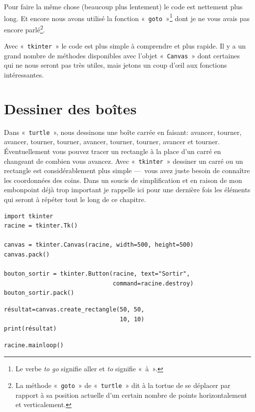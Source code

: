 Pour faire la même chose (beaucoup plus lentement) le code est nettement plus long. Et encore nous avons utilisé la fonction « \texttt{goto} »\footnote{Le verbe \emph{to go} signifie aller et \emph{to} signifie « à ».} dont je ne vous avais pas encore parlé\footnote{La méthode « \texttt{goto} » de « \texttt{turtle} » dit à la tortue de se déplacer par rapport à sa position actuelle d'un certain nombre de points horizontalement et verticalement.}. 

Avec « \texttt{tkinter} » le code est plus simple à comprendre et plus rapide. Il y a un grand nombre de méthodes disponibles avec l'objet « \texttt{Canvas} » dont certaines qui ne nous seront pas très utiles, mais jetons un coup d'œil aux fonctions intéressantes.

\section{Dessiner des boîtes}

Dans « \texttt{turtle} », nous dessinons une boîte carrée en faisant: avancer, tourner, avancer, tourner, tourner, avancer, tourner, tourner, avancer et tourner. Éventuellement vous pouvez tracer un rectangle à la place d'un carré en changeant de combien vous avancez. Avec « \texttt{tkinter} » dessiner un carré ou un rectangle est considérablement plus simple --- vous avez juste besoin de connaître les coordonnées des coins.
Dans un soucis de simplification et en raison de mon embonpoint déjà trop important je rappelle ici pour une dernière fois les éléments qui seront à répéter tout le long de ce chapitre.

\begin{Verbatim}[frame=single,rulecolor=\color{mbleu}, label=à taper (ne sera plus indiqué par la suite)]
import tkinter
racine = tkinter.Tk()

canvas = tkinter.Canvas(racine, width=500, height=500)
canvas.pack()

bouton_sortir = tkinter.Button(racine, text="Sortir",
                               command=racine.destroy)
bouton_sortir.pack()
\end{Verbatim}

\begin{Verbatim}[frame=single,rulecolor=\color{mbleu}, label=à taper]
résultat=canvas.create_rectangle(50, 50, 
                                 10, 10)
print(résultat)
\end{Verbatim}

\begin{Verbatim}[frame=single,rulecolor=\color{mbleu}, label=à taper (ne sera plus indiqué par la suite)]
racine.mainloop()
\end{Verbatim}

